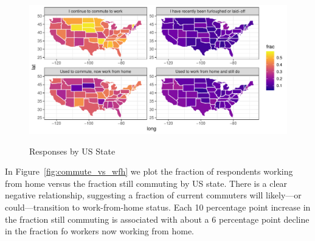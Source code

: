 \documentclass[12pt]{article}
\begin{document}
\begin{figure}
  \caption{Responses by US State} \label{fig:geo}
\centering
\begin{minipage}{1.0 \linewidth}
  \includegraphics[width = \linewidth]{plots/geo.pdf} \\
  \begin{footnotesize}
    \end{footnotesize}
\end{minipage}
\end{figure} 

In Figure~\ref{fig:commute_vs_wfh} we plot the fraction of respondents working from home versus the fraction still commuting by US state.
There is a clear negative relationship, suggesting a fraction of current commuters will likely---or could---transition to work-from-home status.
Each 10 percentage point increase in the fraction still commuting is associated with about a 6 percentage point decline in the fraction fo workers now working from home. 
\end{document}
